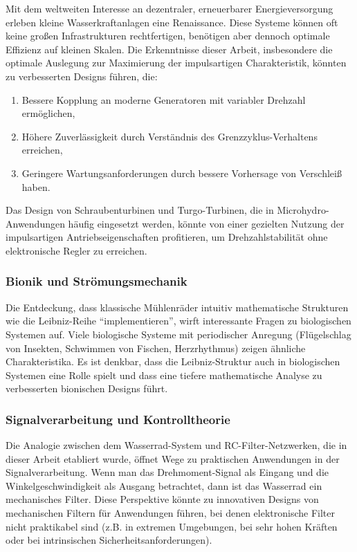 \documentclass[a4paper,12pt]{article}
\theoremstyle{definition}
\begin{document}
Mit dem weltweiten Interesse an dezentraler, erneuerbarer Energieversorgung erleben kleine Wasserkraftanlagen eine Renaissance. Diese Systeme können oft keine großen Infrastrukturen rechtfertigen, benötigen aber dennoch optimale Effizienz auf kleinen Skalen. Die Erkenntnisse dieser Arbeit, insbesondere die optimale Auslegung zur Maximierung der impulsartigen Charakteristik, könnten zu verbesserten Designs führen, die:
\begin{enumerate}
  \item Bessere Kopplung an moderne Generatoren mit variabler Drehzahl ermöglichen,
  \item Höhere Zuverlässigkeit durch Verständnis des Grenzzyklus-Verhaltens erreichen,
  \item Geringere Wartungsanforderungen durch bessere Vorhersage von Verschleiß haben.
\end{enumerate}

Das Design von Schraubenturbinen und Turgo-Turbinen, die in Microhydro-Anwendungen häufig eingesetzt werden, könnte von einer gezielten Nutzung der impulsartigen Antriebseigenschaften profitieren, um Drehzahlstabilität ohne elektronische Regler zu erreichen.

\subsubsection*{Bionik und Strömungsmechanik}

Die Entdeckung, dass klassische Mühlenräder intuitiv mathematische Strukturen wie die Leibniz-Reihe ``implementieren'', wirft interessante Fragen zu biologischen Systemen auf. Viele biologische Systeme mit periodischer Anregung (Flügelschlag von Insekten, Schwimmen von Fischen, Herzrhythmus) zeigen ähnliche Charakteristika. Es ist denkbar, dass die Leibniz-Struktur auch in biologischen Systemen eine Rolle spielt und dass eine tiefere mathematische Analyse zu verbesserten bionischen Designs führt.

\subsubsection*{Signalverarbeitung und Kontrolltheorie}

Die Analogie zwischen dem Wasserrad-System und RC-Filter-Netzwerken, die in dieser Arbeit etabliert wurde, öffnet Wege zu praktischen Anwendungen in der Signalverarbeitung. Wenn man das Drehmoment-Signal als Eingang und die Winkelgeschwindigkeit als Ausgang betrachtet, dann ist das Wasserrad ein mechanisches Filter. Diese Perspektive könnte zu innovativen Designs von mechanischen Filtern für Anwendungen führen, bei denen elektronische Filter nicht praktikabel sind (z.B. in extremen Umgebungen, bei sehr hohen Kräften oder bei intrinsischen Sicherheitsanforderungen).
\end{document}
